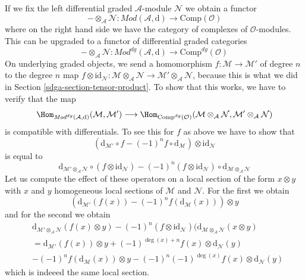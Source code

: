 \medskip\noindent
If we fix the left differential graded $\mathcal{A}$-module $\mathcal{N}$
we obtain a functor
$$
- \otimes_\mathcal{A} \mathcal{N} :
\textit{Mod}(\mathcal{A}, \text{d})
\longrightarrow
\text{Comp}(\mathcal{O})
$$
where on the right hand side we have the category of complexes of
$\mathcal{O}$-modules. This can be upgraded to a functor of
differential graded categories
$$
- \otimes_\mathcal{A} \mathcal{N} :
\textit{Mod}^{dg}(\mathcal{A}, \text{d})
\longrightarrow
\text{Comp}^{dg}(\mathcal{O})
$$
On underlying graded objects, we send
a homomorphism $f : \mathcal{M} \to \mathcal{M}'$ of degree $n$
to the degree $n$ map
$f \otimes \text{id}_\mathcal{N} :
\mathcal{M} \otimes_\mathcal{A} \mathcal{N} \to
\mathcal{M}' \otimes_\mathcal{A} \mathcal{N}$, because
this is what we did in Section \ref{sdga-section-tensor-product}.
To show that this works, we have to verify that the map
$$
\Hom_{\textit{Mod}^{dg}(\mathcal{A}, \text{d})}(\mathcal{M}, \mathcal{M}')
\longrightarrow
\Hom_{\text{Comp}^{dg}(\mathcal{O})}(
\mathcal{M} \otimes_\mathcal{A} \mathcal{N},
\mathcal{M}' \otimes_\mathcal{A} \mathcal{N})
$$
is compatible with differentials. To see this for $f$ as above
we have to show that
$$
(\text{d}_{\mathcal{M}'} \circ f - (-1)^n f \circ \text{d}_\mathcal{M})
\otimes \text{id}_\mathcal{N}
$$
is equal to
$$
\text{d}_{\mathcal{M}' \otimes_\mathcal{A} \mathcal{N}}
\circ (f \otimes \text{id}_\mathcal{N})
- (-1)^n (f \otimes \text{id}_\mathcal{N}) \circ
\text{d}_{\mathcal{M} \otimes_\mathcal{A} \mathcal{N}}
$$
Let us compute the effect of these operators on a local section
of the form $x \otimes y$ with $x$ and $y$ homogeneous local sections
of $\mathcal{M}$ and $\mathcal{N}$. For the first we obtain
$$
(\text{d}_{\mathcal{M}'}(f(x)) - (-1)^n f(\text{d}_\mathcal{M}(x))) \otimes y
$$
and for the second we obtain
\begin{align*}
&\text{d}_{\mathcal{M}' \otimes_\mathcal{A} \mathcal{N}}(f(x) \otimes y)
- (-1)^n (f \otimes \text{id}_\mathcal{N})(
\text{d}_{\mathcal{M} \otimes_\mathcal{A} \mathcal{N}}(x \otimes y) \\
& =
\text{d}_{\mathcal{M}'}(f(x)) \otimes y +
(-1)^{\deg(x) + n}f(x) \otimes \text{d}_\mathcal{N}(y) \\
&
-(-1)^n f(\text{d}_\mathcal{M}(x)) \otimes y
-(-1)^n (-1)^{\deg(x)}f(x) \otimes \text{d}_\mathcal{N}(y)
\end{align*}
which is indeeed the same local section.

